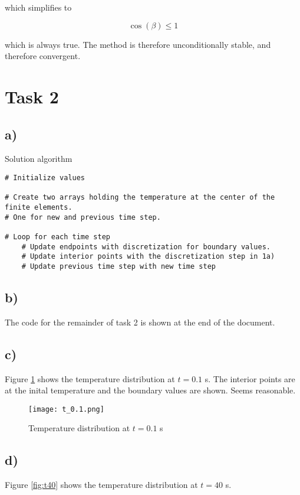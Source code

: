 \documentclass{article}
\begin{document}
which simplifies to 

\begin{equation}
 	\cos(\beta) \leq 1
\end{equation}

which is always true. The method is therefore unconditionally stable, and therefore convergent.

\section*{Task 2}

\subsection*{a)}

Solution algorithm

\begin{lstlisting}
# Initialize values

# Create two arrays holding the temperature at the center of the finite elements. 
# One for new and previous time step.

# Loop for each time step
	# Update endpoints with discretization for boundary values.
	# Update interior points with the discretization step in 1a)
	# Update previous time step with new time step
\end{lstlisting}

\subsection*{b)}

The code for the remainder of task 2 is shown at the end of the document.

\subsection*{c)}

Figure \ref{fig:t01} shows the temperature distribution at $t=0.1$ s. The interior points are at the inital temperature and the boundary values are shown. Seems reasonable.

\begin{figure}
	\texttt{[image: t\_0.1.png]}
	\caption{Temperature distribution at $t=0.1$ s}
	\label{fig:t01}
\end{figure}

\subsection*{d)}
Figure \ref{fig:t40} shows the temperature distribution at $t=40$ s.
\end{document}
